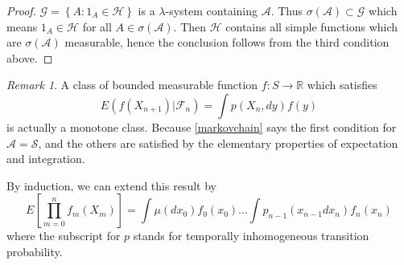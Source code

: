 \documentclass{memoir}
\theoremstyle{definition}
\theoremstyle{remark}
\newtheorem*{remark}{Remark}
\begin{document}
\begin{proof}
	$\mathcal{G} = \left\{ A:1_A \in \mathcal{H} \right\}$ is a $\lambda$-system containing $\mathcal{A}$.
	Thus $\sigma(\mathcal{A}) \subset \mathcal{G}$ which means $1_A \in \mathcal{H}$ for all $A \in \sigma(\mathcal{A})$.
	Then $\mathcal{H}$ contains all simple functions which are $\sigma(\mathcal{A})$ measurable, hence the conclusion follows from the third condition above.
\end{proof}

\begin{remark}
	A class of bounded measurable function $f:S \rightarrow \mathbb{R}$ which satisfies
	\[
		E\left( f(X_{n+1}) \lvert \mathcal{F}_n \right) = \int p(X_n, dy)f(y)
	\]
	is actually a monotone class. 
	Because \ref{markovchain} says the first condition for $\mathcal{A} = \mathcal{S}$,
	and the others are satisfied by the elementary properties of expectation and integration.

	By induction, we can extend this result by
	\[
		E\left[ \prod_{m=0}^n f_m(X_m) \right] = \int\mu(dx_0)f_0(x_0) \dots \int p_{n-1}(x_{n-1}dx_n)f_n(x_n)
	\]
	where the subscript for $p$ stands for temporally inhomogeneous transition probability.
	\label{<+label+>}
\end{remark}
\end{document}
